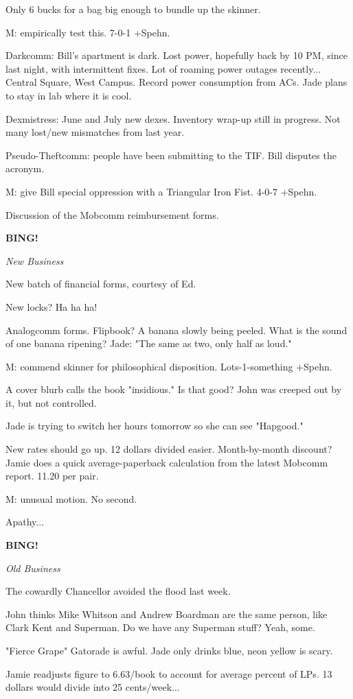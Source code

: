 \documentclass[12pt]{article}
\newcommand{\bing}{{\bf BING!} }
\newcommand{\goto}[1]{\bing \vskip 12pt \centerline{{\em{#1}}}}
\begin{document}
Only 6 bucks for a bag big enough to bundle up the skinner.

M: empirically test this. 7-0-1 +Spehn.

Darkcomm: Bill's apartment is dark. Lost power, hopefully back by 10 PM, since last night, with intermittent fixes. Lot of roaming power outages recently... Central Square, West Campus. Record power consumption from ACs. Jade plans to stay in lab where it is cool.

Dexmistress: June and July new dexes. Inventory wrap-up still in progress. Not many lost/new mismatches from last year.

Pseudo-Theftcomm: people have been submitting to the TIF. Bill disputes the acronym.

M: give Bill special oppression with a Triangular Iron Fist. 4-0-7 +Spehn.

Discussion of the Mobcomm reimbursement forms.

\goto{New Business}

New batch of financial forms, courtesy of Ed.

New locks? Ha ha ha!

Analogcomm forms. Flipbook? A banana slowly being peeled. What is the sound of one banana ripening? Jade: "The same as two, only half as loud."

M: commend skinner for philosophical disposition. Lots-1-something +Spehn.

A cover blurb calls the book "insidious." Is that good? John was creeped out by it, but not controlled.

Jade is trying to switch her hours tomorrow so she can see "Hapgood."

New rates should go up. 12 dollars divided easier. Month-by-month discount? Jamie does a quick average-paperback calculation from the latest Mobcomm report. 11.20 per pair.

M: unusual motion. No second.

Apathy...

\goto{Old Business}

The cowardly Chancellor avoided the flood last week.

John thinks Mike Whitson and Andrew Boardman are the same person, like Clark Kent and Superman. Do we have any Superman stuff? Yeah, some.

"Fierce Grape" Gatorade is awful. Jade only drinks blue, neon yellow is scary.

Jamie readjusts figure to 6.63/book to account for average percent of LPs. 13 dollars would divide into 25 cents/week...
\end{document}
